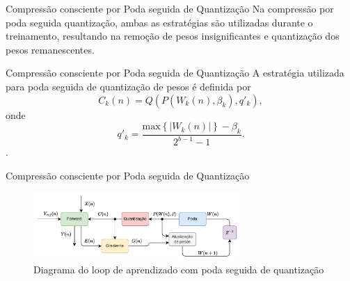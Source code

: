 \begin{frame}{Compressão consciente por Poda seguida de Quantização}
    Na compressão por poda seguida quantização, ambas as estratégias são utilizadas durante o treinamento, resultando na remoção de pesos insignificantes e quantização dos pesos remanescentes.
    
\end{frame}


\begin{frame}{Compressão consciente por Poda seguida de Quantização}
    A estratégia utilizada para poda seguida de quantização de pesos é definida por 
    \begin{equation}\label{EqPruningQuantization}
    C_k(n) = Q\left (  P \left ( W_k(n) , \beta_k \right ), q'_k \right),
    \end{equation}
    onde
    \begin{equation}
    q'_k = \frac{\text{max} \left \{ \left | W_k(n) \right | \right \} - \beta_k }{2^{b-1}-1}.
    \end{equation}.

\end{frame}

\begin{frame}{Compressão consciente por Poda seguida de Quantização}
    \begin{figure}[H]
    \centering
    \includegraphics[width=0.7\textwidth]{figuras/prunequant_scheme.pdf}
    \caption{Diagrama do loop de aprendizado com poda seguida de quantização}
    \end{figure}
\end{frame}

